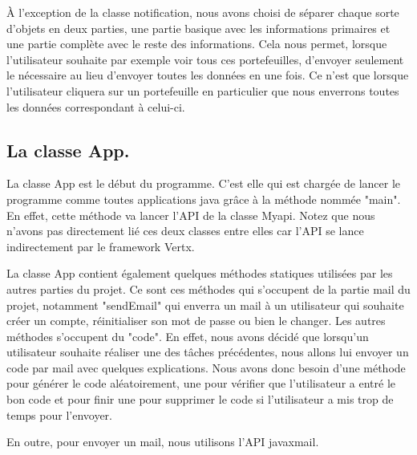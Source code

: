 \begin{flushleft}
À l'exception de la classe notification, nous avons choisi de séparer chaque sorte d'objets en deux parties, une partie basique avec les informations primaires et une partie complète avec le reste des informations. Cela nous permet, lorsque l'utilisateur souhaite par exemple voir tous ces portefeuilles, d'envoyer seulement le nécessaire au lieu d'envoyer toutes les données en une fois. Ce n'est que lorsque l'utilisateur cliquera sur un portefeuille en particulier que nous enverrons toutes les données correspondant à celui-ci.
\end{flushleft}
\newpage
\subsection{La classe App.}

\begin{flushleft}
La classe App est le début du programme. C'est elle qui est chargée de lancer le programme comme toutes applications java grâce à la méthode nommée "main". En effet, cette méthode va lancer l'API de la classe Myapi. Notez que nous n'avons pas directement lié ces deux classes entre elles car l'API se lance indirectement par le framework Vertx.
\end{flushleft}

\begin{flushleft}
La classe App contient également quelques méthodes statiques utilisées par les autres parties du projet. Ce sont ces méthodes qui s'occupent de la partie mail du projet, notamment "sendEmail" qui enverra un mail à un utilisateur qui souhaite créer un compte, réinitialiser son mot de passe ou bien le changer. Les autres méthodes s'occupent du "code". En effet, nous avons décidé que lorsqu'un utilisateur souhaite réaliser une des tâches précédentes, nous allons lui envoyer un code par mail avec quelques explications. Nous avons donc besoin d'une méthode pour générer le code aléatoirement, une pour vérifier que l'utilisateur a entré le bon code et pour finir une pour supprimer le code si l'utilisateur a mis trop de temps pour l'envoyer.
\end{flushleft}

\begin{flushleft}
En outre, pour envoyer un mail, nous utilisons l'API javaxmail.
\end{flushleft}


